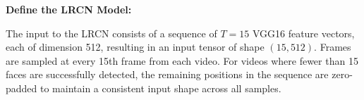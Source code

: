 








    \item \textbf{Define the LRCN Model:}

    The input to the LRCN consists of a sequence of $T = 15$ VGG16 feature vectors, each of dimension 512, resulting in an input tensor of shape $(15, 512)$. Frames are sampled at every 15th frame from each video. For videos where fewer than 15 faces are successfully detected, the remaining positions in the sequence are zero-padded to maintain a consistent input shape across all samples.

